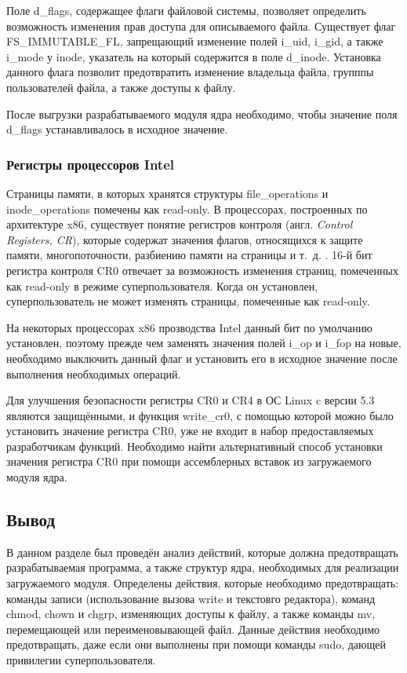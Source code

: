 Поле d\_flags, содержащее флаги файловой системы, позволяет определить возможность изменения прав доступа для описываемого файла. Существует флаг FS\_IMMUTABLE\_FL, запрещающий изменение полей i\_uid, i\_gid, а также i\_mode у inode, указатель на который содержится в поле d\_inode. Установка данного флага позволит предотвратить изменение владельца файла, групппы пользователей файла, а также доступы к файлу.

После выгрузки разрабатываемого модуля ядра необходимо, чтобы значение поля d\_flags устанавливалось в исходное значение.


\subsubsection{Регистры процессоров Intel}

Страницы памяти, в которых хранятся структуры file\_operations и \linebreak inode\_operations помечены как read-only. В процессорах, построенных по архитектуре x86, существует понятие регистров контроля (англ. \textit{Control Registers, CR}), которые содержат значения флагов, относящихся к защите памяти, многопоточности, разбиению памяти на страницы и т.~д. \cite{intel-manual}. 16-й бит регистра контроля CR0 отвечает за возможность изменения страниц, помеченных как read-only в режиме суперпользователя. Когда он установлен, суперпользователь не может изменять страницы, помеченные как read-only.

На некоторых процессорах x86 прозводства Intel данный бит по умолчанию установлен, поэтому прежде чем заменять значения полей i\_op и i\_fop на новые, необходимо выключить данный флаг и установить его в исходное значение после выполнения необходимых операций.

Для улучшения безопасности регистры CR0 и CR4 в ОС Linux c версии 5.3 являются защищёнными, и функция write\_cr0, с помощью которой можно было установить значение регистра CR0, уже не входит в набор предоставляемых разработчикам функций. Необходимо найти альтернативный способ установки значения регистра CR0 при помощи ассемблерных вставок из загружаемого модуля ядра.

\subsection*{Вывод}
В данном разделе был проведён анализ действий, которые должна предотвращать разрабатываемая программа, а также структур ядра, необходимых для реализации загружаемого модуля.
Определены действия, которые необходимо предотвращать: команды записи (использование вызова write и текстовго редактора), команд chmod, chown и chgrp, изменяющих доступы к файлу, а также команды mv, перемещающей или переименовывающей файл. Данные действия необходимо предотвращать, даже если они выполнены при помощи команды sudo, дающей привилегии суперпользователя.

